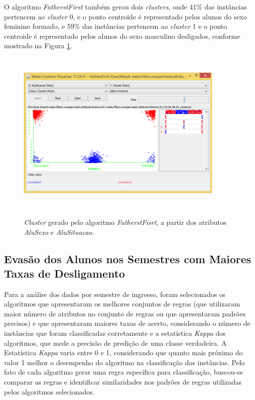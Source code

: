  O algoritmo \textit{FatherstFirst} também gerou dois \textit{clusters}, onde 41\% das instâncias pertencem ao \textit{cluster} 0, e o ponto centroide é representado pelos alunos do sexo feminino formado, e  59\% das instâncias pertencem ao \textit{cluster} 1 e o ponto centroide é representado pelos alunos do sexo masculino desligados, conforme mostrado na Figura \ref{cluster-first}.
 
 \begin{figure}[!h]
 	\centering
 	{\includegraphics[width=10cm, height=8cm]{images/cluster-first}}
 	\caption {\textit{Cluster} gerado pelo algoritmo \textit{FatherstFisrt}, a partir dos atributos \textit{AluSexo} e \textit{AluSituacao}.}
 	\label{cluster-first}
 \end{figure}
 
\subsection{Evasão dos Alunos nos Semestres com Maiores Taxas de Desligamento} \label{resultado2}

Para a análise dos dados por semestre de ingresso, foram selecionados os algoritmos que apresentaram os melhores conjuntos de regras (que utilizaram maior número de atributos no conjunto de regras ou que apresentaram padrões precisos) e que apresentaram maiores taxas de acerto, considerando o número de instâncias que foram classificadas corretamente e a estatística \textit{Kappa} dos algoritmos, que mede a precisão de predição de uma classe verdadeira. A Estatística \textit{Kappa} varia entre 0 e 1, considerando que quanto mais próximo do valor 1 melhor o desempenho do algoritmo na classificação das instâncias. Pelo fato de cada algoritmo gerar uma regra específica para classificação, buscou-se comparar as regras e identificar similaridades nos padrões de regras utilizadas pelos algoritmos selecionados. 

